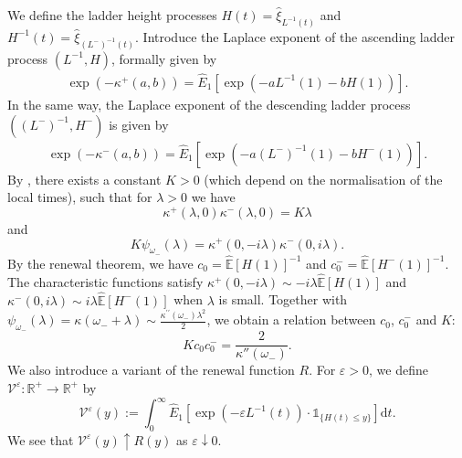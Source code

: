 \documentclass[12pt]{article}
\numberwithin{equation}{section}
\theoremstyle{plain}
\theoremstyle{definition}
\newcommand{\D}{\mathrm{d}}
\begin{document}
We define the ladder height processes $H(t)=\hat{\xi}_{L^{-1}(t)}$ and $H^{-1}(t)=\hat{\xi}_{(L^-)^{-1}(t)} $. Introduce the Laplace exponent of the ascending ladder process $(L^{-1},H)$, formally given by
\begin{align}\label{eq: def kappa+}
    \exp(-\kappa^+(a,b)) = \hat E_1[\exp(-a L^{-1}(1)-b H(1))].
\end{align}
In the same way, the Laplace exponent of the descending ladder process $((L^-)^{-1}, H^{-})$ is given by
\begin{align}\label{eq: def kappa-}
    \exp(-\kappa^-(a, b)) = \hat{E}_1[\exp(-a (L^-)^{-1}(1)- b H^-(1))].
\end{align}
By \cite[Section 5, Equation (3)(4)]{bertoin1996levy}, there exists a constant $K>0$ (which depend on the normalisation of the local times), such that  for $\lambda>0$ we have
\begin{equation}\label{eq: Hopf decomp}
\kappa^+(\lambda, 0) \kappa^-(\lambda, 0) = K\lambda
\end{equation}
and
\begin{equation*}
    K\psi_{\omega_-}(\lambda) = \kappa^+(0, -i\lambda)\kappa^-(0, i\lambda).
\end{equation*}
By the renewal theorem, we have $c_0 = \hat{\mathbb{E}}[H(1)]^{-1}$ and $c_0^- = \hat{\mathbb{E}}[H^-(1)]^{-1}$. The characteristic functions satisfy $\kappa^+(0, -i\lambda) \sim -i\lambda \hat{\mathbb{E}}[H(1)]$ and $\kappa^-(0, i\lambda) \sim i\lambda \hat{\mathbb{E}}[H^-(1)]$ when $\lambda$ is small. Together with $\psi_{\omega_-}(\lambda) = \kappa(\omega_-+\lambda)\sim \frac{\kappa^{\prime\prime}(\omega_-)\lambda^2}{2}$, we obtain a relation between $c_0$, $c_0^-$ and $K$:
\begin{equation}\label{eq: relation between K and c}
    Kc_0c_0^-=\frac{2}{\kappa''(\omega_-)}.
\end{equation}
We also introduce a variant of the renewal function $R$. For $\varepsilon>0$, we define $\mathscr{V}^{\varepsilon}: \mathbb R^+\to \mathbb R^+$ by
\begin{equation}\label{eq: def V}
   \mathscr{V}^{\varepsilon}(y):=\int_0^{\infty} \hat E_1[\exp(-\varepsilon L^{-1}(t))\cdot \mathds{1}_{\{H(t)\le y\}}]\D t.
\end{equation}
We see that $\mathscr{V}^{\varepsilon}(y)\uparrow R(y)$ as $\varepsilon\downarrow 0$.
\end{document}
